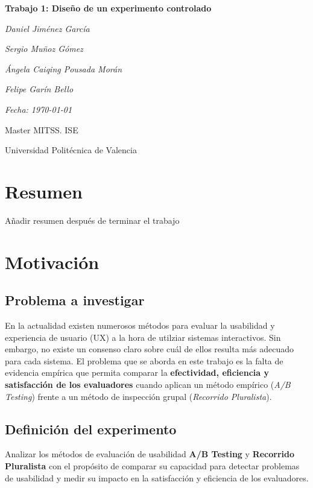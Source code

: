 \documentclass[a4paper,12pt]{report}
\begin{document}
\begin{titlepage}
    \centering
    \vspace*{3cm}
    {\Huge\bfseries Trabajo 1: Diseño de un experimento controlado \par}
    \vspace{2cm}
    {\Large\itshape Daniel Jiménez García \par}
    {\Large\itshape Sergio Muñoz Gómez \par}
    {\Large\itshape Ángela Caiqing Pousada Morán \par}
    {\Large\itshape Felipe Garín Bello \par}
    \vspace{1cm}
    {\Large\itshape Fecha: \today \par}
    \vfill
    {\large Master MITSS. ISE \par}
    {\large Universidad Politécnica de Valencia\par}
\end{titlepage}


\chapter*{Resumen}

Añadir resumen después de terminar el trabajo


\chapter{Motivación}

\section{Problema a investigar}
En la actualidad existen numerosos métodos para evaluar la usabilidad y experiencia de usuario (UX) a la hora de utilziar sistemas interactivos. Sin embargo, no existe un consenso claro sobre cuál de ellos resulta más adecuado para cada sistema.  
El problema que se aborda en este trabajo es la falta de evidencia empírica que permita comparar la \textbf{efectividad, eficiencia y satisfacción de los evaluadores} cuando aplican un método empírico (\textit{A/B Testing}) frente a un método de inspección grupal (\textit{Recorrido Pluralista}).

\section{Definición del experimento}
Analizar los métodos de evaluación de usabilidad \textbf{A/B Testing} y \textbf{Recorrido Pluralista} con el propósito de comparar su capacidad para detectar problemas de usabilidad y medir su impacto en la satisfacción y eficiencia de los evaluadores.
\end{document}

